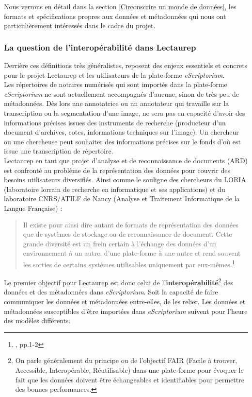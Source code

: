 Nous verrons en détail dans la section \ref{Circonscrire un monde de données}, les formats et spécifications propres aux données et métadonnées qui nous ont particulièrement intéressés dans le cadre du projet.\\ 

\subsubsection{La question de l'interopérabilité dans Lectaurep}
Derrière ces définitions très généralistes, reposent des enjeux essentiels et concrets pour le projet Lectaurep et les utilisateurs de la plate-forme \textit{eScriptorium}. \\

Les répertoires de notaires numérisés qui sont importés dans la plate-forme \textit{eScriptorium} ne sont actuellement accompagnés d'aucune, sinon de très peu de métadonnées. Dès lors une annotatrice ou un annotateur qui travaille sur la transcription ou la segmentation d'une image, ne sera pas en capacité d'avoir des informations précises issues des instruments de recherche (producteur d'un document d'archives, cotes, informations techniques sur l'image). Un chercheur ou une chercheuse peut souhaiter des informations précises sur le fonds d'où est issue une transcription de répertoire.\\ 
\newpage
Lectaurep en tant que projet d'analyse et de reconnaissance de documents (ARD) est confronté au problème de la représentation des données pour couvrir des besoins utilisateurs diversifiés. Ainsi comme le souligne des chercheurs du LORIA (laboratoire lorrain de recherche en informatique et ses applications) et du laboratoire CNRS/ATILF de Nancy (Analyse et Traitement Informatique de la Langue Française) : 
\begin{quote}
    Il existe pour ainsi dire autant de formats de représentation des données que de systèmes de stockage ou de reconnaissance de document. Cette grande diversité est un frein certain à l'échange des données d'un environnement à un autre, d'une plate-forme à une autre et rend souvent les sorties de certains systèmes utilisables uniquement par eux-mêmes.\footnote{\cite{belaid_representation_2007}, pp.1-2}
\end{quote}

Le premier objectif pour Lectaurep est donc celui de l'\textbf{interopérabilité}\footnote{On parle généralement du principe ou de l'objectif FAIR (Facile à trouver, Accessible, Interopérable, Réutilisable) dans une plate-forme pour évoquer le fait que les données doivent être échangeables et identifiables pour permettre des bonnes performances.} des données et des métadonnées dans \textit{eScriptorium}. Soit la capacité de faire communiquer les données et métadonnées entre-elles, de les relier. Les données et métadonnées susceptibles d'être importées dans \textit{eScriptorium} suivent pour l'heure des modèles différents.\\

